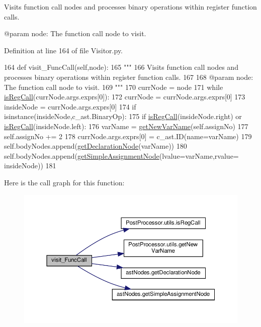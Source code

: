 \begin{DoxyVerb}Visits function call nodes and processes binary operations within register function calls.

@param node: The function call node to visit.
\end{DoxyVerb}
 

Definition at line 164 of file Visitor.\+py.


\begin{DoxyCode}
164     \textcolor{keyword}{def }visit\_FuncCall(self,node):
165         \textcolor{stringliteral}{"""
}
166 \textcolor{stringliteral}{        Visits function call nodes and processes binary operations within register function calls.
}
167 \textcolor{stringliteral}{
}
168 \textcolor{stringliteral}{        @param node: The function call node to visit.
}
169 \textcolor{stringliteral}{        """}
170         currNode = node
171         \textcolor{keywordflow}{while} \hyperlink{namespacePostProcessor_1_1utils_a89d6f2461251261de6b862c69fe3c44a}{isRegCall}(currNode.args.exprs[0]):
172             currNode = currNode.args.exprs[0]
173         insideNode = currNode.args.exprs[0]
174         \textcolor{keywordflow}{if} isinstance(insideNode,c\_ast.BinaryOp):
175             \textcolor{keywordflow}{if} \hyperlink{namespacePostProcessor_1_1utils_a89d6f2461251261de6b862c69fe3c44a}{isRegCall}(insideNode.right) \textcolor{keywordflow}{or} \hyperlink{namespacePostProcessor_1_1utils_a89d6f2461251261de6b862c69fe3c44a}{isRegCall}(insideNode.left):
176                 varName = \hyperlink{namespacePostProcessor_1_1utils_a69c4094b747eccefbd43b8011b1c3626}{getNewVarName}(self.assignNo)
177                 self.assignNo += 2
178                 currNode.args.exprs[0] = c\_ast.ID(name=varName)
179                 self.bodyNodes.append(\hyperlink{namespaceastNodes_ae5e5c7f09a1586002b20db6d72f6d30b}{getDeclarationNode}(varName))
180                 self.bodyNodes.append(\hyperlink{namespaceastNodes_a2403f5d006e54f20e614226280cb6cbc}{getSimpleAssignmentNode}(lvalue=varName,rvalue=
      insideNode))
181 
\end{DoxyCode}
Here is the call graph for this function\+:\nopagebreak
\begin{figure}[H]
\begin{center}
\leavevmode
\includegraphics[width=350pt]{classPostProcessor_1_1Visitor_1_1BinaryOpInRegHandler_a48e7baeee3968db14598ff72b6be63bd_cgraph}
\end{center}
\end{figure}


